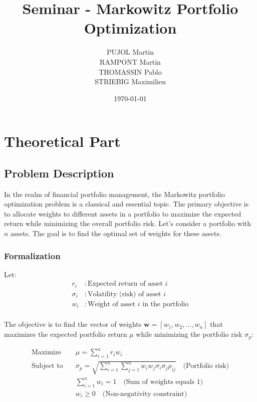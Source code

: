 \documentclass[12pt]{article}
\title{Seminar - Markowitz Portfolio Optimization}
\author{PUJOL Martin \\ RAMPONT Martin \\ THOMASSIN Pablo \\ STRIEBIG Maximilien}
\date{\today}
\begin{document}
\maketitle

\section*{Theoretical Part}

\subsection*{Problem Description}

In the realm of financial portfolio management, the Markowitz portfolio optimization problem is a classical and essential topic. The primary objective is to allocate weights to different assets in a portfolio to maximize the expected return while minimizing the overall portfolio risk. Let's consider a portfolio with $n$ assets. The goal is to find the optimal set of weights for these assets.

\subsubsection*{Formalization}

Let:
\begin{align*}
    r_i      & : \text{Expected return of asset } i                 \\
    \sigma_i & : \text{Volatility (risk) of asset } i               \\
    w_i      & : \text{Weight of asset } i \text{ in the portfolio} \\
\end{align*}

The objective is to find the vector of weights $\mathbf{w} = [w_1, w_2, \ldots, w_n]$ that maximizes the expected portfolio return $\mu$ while minimizing the portfolio risk $\sigma_p$:

\begin{equation}
    \begin{aligned}
        \text{Maximize} \quad   & \mu = \sum_{i=1}^{n} r_i w_i                                                                                     \\
        \text{Subject to} \quad & \sigma_p = \sqrt{\sum_{i=1}^{n}\sum_{j=1}^{n} w_i w_j \sigma_i \sigma_j \rho_{ij}} \quad \text{(Portfolio risk)} \\
                                & \sum_{i=1}^{n} w_i = 1 \quad \text{(Sum of weights equals 1)}                                                    \\
                                & w_i \geq 0 \quad \text{(Non-negativity constraint)}
    \end{aligned}
\end{equation}
\end{document}
